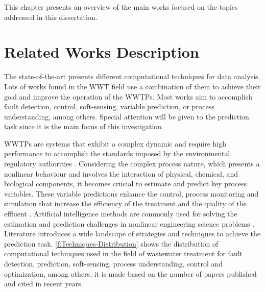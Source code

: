 This chapter presents an overview of the main works focused on the topics addressed in this dissertation.

\section{Related Works Description}
\label{s:RelatedWorks-Description}

The state-of-the-art presents different computational techniques for data analysis. Lots of works found in the \ac{WWT} field use a combination of them to achieve their goal and improve the operation of the \acs{WWTP}s. Most works aim to accomplish fault detection, control, soft-sensing, variable prediction, or process understanding, among others. Special attention will be given to the prediction task since it is the main focus of this investigation.

\ac{WWTP}s are systems that exhibit a complex dynamic and require high performance to accomplish the standards imposed by the environmental regulatory authorities \cite{Corominas2018}. Considering the complex process nature, which presents a nonlinear behaviour and involves the interaction of physical, chemical, and biological components, it becomes crucial to estimate and predict key process variables. These variable predictions enhance the control, process monitoring and simulation that increase the efficiency of the treatment and the quality of the effluent \cite{Aalami2019,Arismendy2020,Liu2020}. Artificial intelligence methods are commonly used for solving the estimation and prediction challenges in nonlinear engineering science problems \cite{Lotfi2019}. Literature introduces a wide landscape of strategies and techniques to achieve the prediction task. 
\autoref{f:Techniques-Distribution} \cite{Corominas2018} shows the distribution of computational techniques used in the field of wastewater treatment for fault detection, prediction, soft-sensing, process understanding, control and optimization, among others, it is made based on the number of papers published and cited in recent years. 

